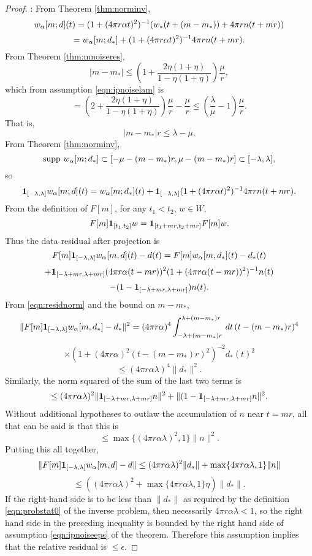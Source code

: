 \begin{proof}:
From Theorem \ref{thm:norminv}, 
\[
  w_{\alpha}[m;d](t) = (1+ (4 \pi r \alpha t)^2)^{-1}(w_*(t+(m-m_*)) + 4\pi r 
  n(t+mr)) 
\]
\[
  = w_{\alpha}[m;d_*] + (1+ (4 \pi r \alpha t)^2)^{-1}4\pi r n(t+mr).
\]
From Theorem \ref{thm:mnoiseres},
\[
  |m-m_*| \le \left(1+\frac{2\eta(1+\eta)}{1-\eta(1+\eta)}\right)\frac{\mu}{r},
\]
which from assumption \ref{eqn:ipnoiselam} is
\[
  =\left(2+\frac{2\eta(1+\eta)}{1-\eta(1+\eta)}\right)\frac{\mu}{r}
  -\frac{\mu}{r} \le \left(\frac{\lambda}{\mu}-1\right)\frac{\mu}{r}.
\]
That is,
\[
  |m-m_*|r \le \lambda-\mu.
\]
From Theorem \ref{thm:norminv},
\[
  \mbox{supp }w_{\alpha}[m;d_*] \subset [-\mu-(m-m_*)r, \mu-(m-m_*)r]
  \subset [-\lambda,\lambda],
\]
so
\[
  {\bf 1}_{[-\lambda,\lambda]}w_{\alpha}[m;d](t) = w_{\alpha}[m;d_*](t) + {\bf 1}_{[-\lambda,\lambda]}(1+ (4 \pi r \alpha
  t)^2)^{-1}4\pi r n(t+mr).
\]
From the definition of $F[m]$, for any $t_1<t_2$, $w \in W$,  
\[
  F[m]{\bf 1}_{[t_1.t_2]}w = {\bf 1}_{[t_1+mr,t_2+mr]}F[m]w.
\]
Thus the data residual after projection is
\[
  F[m]{\bf 1}_{[-\lambda,\lambda]}w_{\alpha}[m,d](t) -d(t) = F[m]w_{\alpha}[m,d_*](t) -d_*(t)  
\]
\[
  + {\bf 1}_{[-\lambda+mr,\lambda+mr]}(4 \pi r \alpha (t-mr))^2 (1+ (4 \pi
  r \alpha (t-mr))^2)^{-1} n(t)
\]
\[
  -(1- {\bf 1}_{[-\lambda+mr,\lambda+mr]})n(t).
\]
From \ref{eqn:residnorm} and the bound on $m-m_*$,
\[
  \| F[m]{\bf 1}_{[-\lambda,\lambda]}w_{\alpha}[m,d_*] -d_*\|^2 = (4 \pi r \alpha)^4
  \int_{-\lambda+(m-m_*)r}^{\lambda+(m-m_*)r}\,dt\, (t-(m-m_*)r)^4
\]
\[
  \times (1+(4\pi r \alpha)^2 
  (t-(m-m_*)r)^2)^{-2}d_*(t)^2
\]
\[
  \le (4 \pi r \alpha \lambda)^4\|d_*\|^2.
\]
Similarly, the norm squared of the sum of the last two terms is 
\[
  \le (4 \pi r \alpha \lambda)^2 \|{\bf 1}_{[-\lambda+mr,\lambda+mr]}
  n\|^2 + \|(1 - {\bf 1}_{[-\lambda+mr,\lambda+mr]}n\|^2.
\]
Without additional hypotheses to outlaw the accumulation of $n$ near
$t=mr$, all that can be said is that this is
\[
  \le \max \{(4 \pi r \alpha \lambda)^2, 1\} \|n\|^2.
\]
Putting this all together,
\[
  \|F[m]{\bf 1}_{[-\lambda,\lambda]}w_{\alpha}[m,d]-d\| \le (4 \pi r \alpha
  \lambda)^2\|d_*\| + \max \{4\pi r \alpha \lambda, 1\}\|n\|
\]
\[
  \le ((4 \pi r \alpha \lambda)^2 +\max \{4\pi r \alpha \lambda, 1\}
  \eta)\|d_*\|.
\]
If the right-hand side is to be less than $\|d_*\|$ as required by the
definition \ref{eqn:probstat0} of the inverse problem, then
necessarily $4\pi r\alpha \lambda < 1$, so the right hand side in the
preceding inequality is bounded by the right hand side of assumption
\ref{eqn:ipnoiseeps} of the theorem. Therefore this assumption implies
that the relative residual is $\le \epsilon$.
\end{proof}


